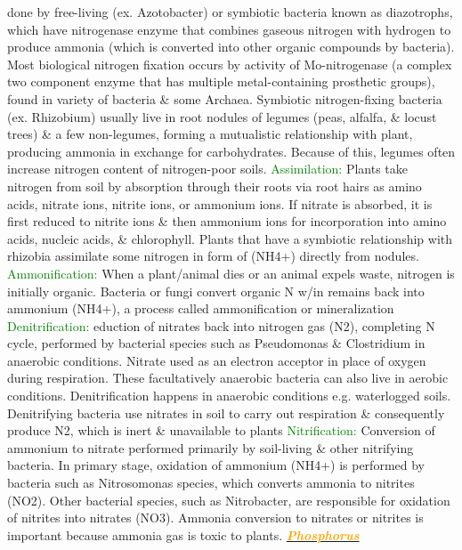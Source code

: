 \documentclass{article}
\newcommand{\green}[1]{\textcolor{green}{#1}}
\newcommand{\orange}[1]{\textcolor{orange}{#1}}
\newcommand{\mysubsection}[1]{\underline{\textbf{{\textit{\orange{#1}}}}}}
\newcommand{\mysubsub}[1]{{{\green{#1}}}}
\begin{document}
\begin{multicols*}{4}
				done by free-living (ex. Azotobacter) or symbiotic bacteria known as diazotrophs, which have nitrogenase enzyme that combines gaseous nitrogen with hydrogen to produce ammonia (which is converted into other organic compounds by bacteria). Most biological nitrogen fixation occurs by activity of Mo-nitrogenase (a complex two component enzyme that has multiple metal-containing prosthetic groups), found in variety of bacteria \& some Archaea. Symbiotic nitrogen-fixing bacteria (ex. Rhizobium) usually live in root nodules of legumes (peas, alfalfa, \& locust trees) \& a few non-legumes, forming a mutualistic relationship with plant, producing ammonia in exchange for carbohydrates. Because of this, legumes often increase nitrogen content of nitrogen-poor soils.
			\mysubsub{Assimilation: }
				Plants take nitrogen from soil by absorption through their roots via root hairs as amino acids, nitrate ions, nitrite ions, or ammonium ions. If nitrate is absorbed, it is first reduced to nitrite ions \& then ammonium ions for incorporation into amino acids, nucleic acids, \& chlorophyll. Plants that have a symbiotic relationship with rhizobia assimilate some nitrogen in form of (NH4+) directly from nodules.
			\mysubsub{Ammonification: }
				When a plant/animal dies or an animal expels waste, nitrogen is initially organic. Bacteria or fungi convert organic N w/in remains back into ammonium (NH4+), a process called ammonification or mineralization
			\mysubsub{Denitrification: }
				eduction of nitrates back into nitrogen gas (N2), completing N cycle, performed by bacterial species such as Pseudomonas \& Clostridium in anaerobic conditions. Nitrate used as an electron acceptor in place of oxygen during respiration. These facultatively anaerobic bacteria can also live in aerobic conditions. Denitrification happens in anaerobic conditions e.g. waterlogged soils. Denitrifying bacteria use nitrates in soil to carry out respiration \& consequently produce N2, which is inert \& unavailable to plants 
			\mysubsub{Nitrification: } 
				Conversion of ammonium to nitrate performed primarily by soil-living \& other nitrifying bacteria. In primary stage, oxidation of ammonium (NH4+) is performed by bacteria such as Nitrosomonas species, which converts ammonia to nitrites (NO2). Other bacterial species, such as Nitrobacter, are responsible for oxidation of nitrites into nitrates (NO3). Ammonia conversion to nitrates or nitrites is important because ammonia gas is toxic to plants.
		\mysubsection{Phosphorus}

\end{multicols*}
\end{document}
